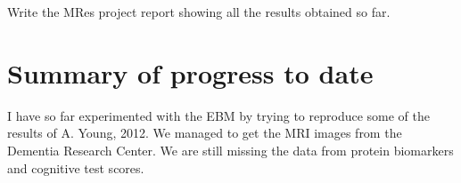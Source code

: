 \documentclass[12pt,a4paper,oneside]{report}
\begin{document}
Write the MRes project report showing all the results obtained so far.




\section*{Summary of progress to date}

I have so far experimented with the EBM by trying to reproduce some of the results of A. Young, 2012. We managed to get the MRI images from the Dementia Research Center. We are still missing the data from protein biomarkers and cognitive test scores. 
\end{document}
